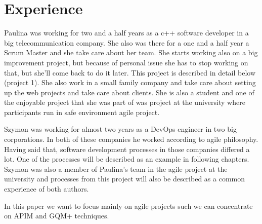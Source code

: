 \section{Experience}

Paulina was working for two and a half years as a c++ software developer in a big telecommunication company. She also was there for a one and a half year a Scrum Master and she take care about her team. She starts working also on a big improvement project, but because of personal issue she has to stop working on that, but she'll come back to do it later. This project is described in detail below (project 1). She also work in a small family company and take care about setting up the web projects and take care about clients. She is also a student and one of the enjoyable project that she was part of was project at the university where participants run in safe environment agile project. 

Szymon was working for almost two years as a DevOps engineer in two big corporations. In both of these companies he worked according to agile philosophy. Having said that, software development processes in those companies differed a lot. One of the processes will be described as an example in following chapters. Szymon was also a member of Paulina's team in the agile project at the university and processes from this project will also be described as a common experience of both authors.

In this paper we want to focus mainly on agile projects such we can concentrate on APIM and GQM+ techniques.
